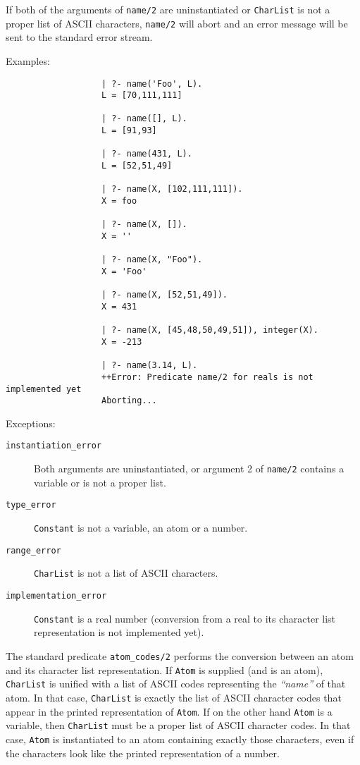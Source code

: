 \begin{description}
    If both of the arguments of {\tt name/2} are uninstantiated or 
    {\tt CharList} is not a proper list of ASCII characters, {\tt name/2} 
    will abort and an error message will be sent to the standard error stream.

    Examples:
    {\footnotesize
     \begin{verbatim}
                   | ?- name('Foo', L).
                   L = [70,111,111]

                   | ?- name([], L).
                   L = [91,93]

                   | ?- name(431, L).
                   L = [52,51,49]

                   | ?- name(X, [102,111,111]).
                   X = foo
 
                   | ?- name(X, []).
                   X = ''

                   | ?- name(X, "Foo").
                   X = 'Foo'

                   | ?- name(X, [52,51,49]).
                   X = 431

                   | ?- name(X, [45,48,50,49,51]), integer(X).
                   X = -213

                   | ?- name(3.14, L).
                   ++Error: Predicate name/2 for reals is not implemented yet
                   Aborting...
     \end{verbatim}}

     Exceptions:
     \begin{description}
     \item[{\tt instantiation\_error}]
	Both arguments are uninstantiated, or argument 2 of {\tt name/2} 
	contains a variable or is not a proper list.
     \item[{\tt type\_error}]
	{\tt Constant} is not a variable, an atom or a number.
     \item[{\tt range\_error}]
	{\tt CharList} is not a list of ASCII characters.
     \item[{\tt implementation\_error}]
	{\tt Constant} is a real number (conversion from a real to its 
	character list representation is not implemented yet).
     \end{description}

    The standard predicate {\tt atom\_codes/2} performs the conversion 
    between an atom and its character list representation. 
    If {\tt Atom} is supplied (and is an atom), {\tt CharList} 
    is unified with a list of ASCII codes representing the {\em ``name''} 
    of that atom.  In that case, {\tt CharList} is exactly the list of 
    ASCII character codes that appear in the printed representation of 
    {\tt Atom}.  If on the other hand {\tt Atom} is a variable, 
    then {\tt CharList} must be a proper list of ASCII character codes. 
    In that case, {\tt Atom} is instantiated to an atom containing
    exactly those characters, even if the characters look like the
    printed representation of a number.


\end{description}
